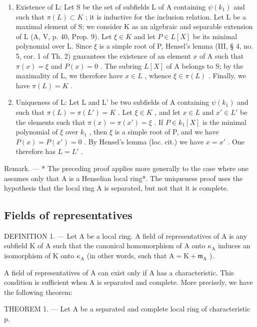\begin{enumerate}
\def\labelenumi{\alph{enumi})}
\item
  Existence of L: Let S be the set of subfields L of A containing \(\psi(k_1)\) and such that \(\pi(L) \subset K\) ; it is inductive for the inclusion relation. Let L be a maximal element of S; we consider K as an algebraic and separable extension of L (A, V, p. 40, Prop. 9). Let \(\xi \in K\) and let \(P \in L[X]\) be its minimal polynomial over L. Since \(\xi\) is a simple root of P, Hensel's lemma (III, § 4, no. 5, cor. 1 of Th. 2) guarantees the existence of an element \(x\) of A such that \(\pi(x) = \xi\) and \(P(x) = 0\) . The subring \(L[X]\) of A belongs to S; by the maximality of L, we therefore have \(x \in L\) , whence \(\xi \in \pi(L)\) . Finally, we have \(\pi(L) = K\) .
\item
  Uniqueness of L: Let L and L' be two subfields of A containing \(\psi(k_1)\) and such that \(\pi(L) = \pi(L') = K\) . Let \(\xi \in K\) , and let \(x \in L\) and \(x' \in L'\) be the elements such that \(\pi(x) = \pi(x') = \xi\) . If \(P \in k_1[X]\) is the minimal polynomial of \(\xi\) over \(k_1\) , then \(\xi\) is a simple root of P, and we have \(P(x) = P(x') = 0\) . By Hensel's lemma (loc. cit.) we have \(x = x'\) . One therefore has \(L = L'\) .
\end{enumerate}

Remark. --- * The preceding proof applies more generally to the case where one assumes only that A is a Henselian local ring*. The uniqueness proof uses the hypothesis that the local ring A is separated, but not that it is complete.

\subsection{Fields of representatives}

DEFINITION 1. --- Let A be a local ring. A field of representatives of A is any subfield K of A such that the canonical homomorphism of A onto \(\kappa_{\mathrm{A}}\) induces an isomorphism of K onto \(\kappa_{\mathrm{A}}\) (in other words, such that \(\mathrm{A} = \mathrm{K} + \mathfrak{m}_{\mathrm{A}}\) ).

A field of representatives of A can exist only if A has a characteristic. This condition is sufficient when A is separated and complete. More precisely, we have the following theorem:

THEOREM 1. --- Let A be a separated and complete local ring of characteristic p.

